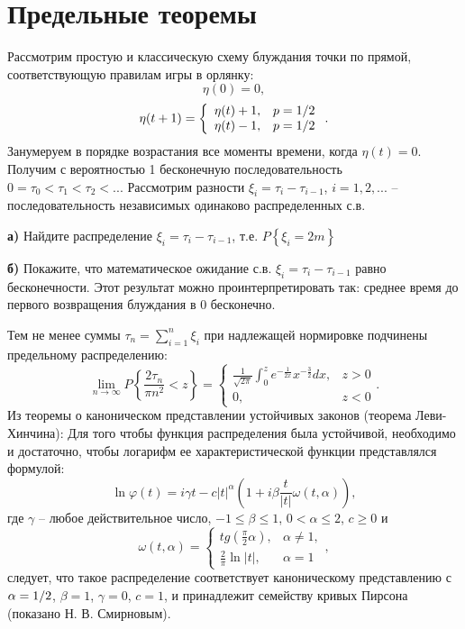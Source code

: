 \section{Предельные теоремы}

\begin{problem}

Рассмотрим простую и классическую схему блуждания точки по прямой, соответствующую правилам игры в орлянку:
\[\eta (0)=0,\] 
\[\eta (t+1)=\left\{\begin{array}{cc} {\eta (t)+1,} & {p={1\mathord{\left/ {\vphantom {1 2}} \right. \kern-\nulldelimiterspace} 2} } \\ {\eta (t)-1,} & {p={1\mathord{\left/ {\vphantom {1 2}} \right. \kern-\nulldelimiterspace} 2} } \end{array}\right. .\] 
Занумеруем в порядке возрастания все моменты времени, когда $\eta (t)=0$. Получим с вероятностью 1 бесконечную последовательность $0=\tau _{0} <\tau _{1} <\tau _{2} <...$ Рассмотрим разности $\xi _{i} =\tau _{i} -\tau _{i-1} $, $i=1,2,...$ -- последовательность независимых одинаково распределенных с.в.

\textbf{а)} Найдите распределение $\xi _{i} =\tau _{i} -\tau _{i-1} $, т.е. $P\left\{\xi _{i} =2m\right\}$

\textbf{б)} Покажите, что математическое ожидание с.в. $\xi _{i} =\tau _{i} -\tau _{i-1} $ равно бесконечности. Этот результат можно проинтерпретировать так: среднее время до первого возвращения блуждания в 0 бесконечно.

Тем не менее суммы $\tau _{n} =\sum _{i=1}^{n}\xi _{i}  $ при надлежащей нормировке подчинены предельному распределению: 
\[\mathop{\lim }\limits_{n\to \infty } P\left\{\frac{2\tau _{n} }{\pi n^{2} } <z\right\}=\left\{\begin{array}{cc} {\frac{1}{\sqrt{2\pi } } \int _{0}^{z}e^{-\frac{1}{2x} } x^{-\frac{3}{2} }  dx,} & {z>0} \\ {0,} & {z<0} \end{array}\right. .\] 
Из теоремы о каноническом представлении устойчивых законов (теорема Леви-Хинчина): Для того чтобы функция распределения была устойчивой, необходимо и достаточно, чтобы логарифм ее характеристической функции представлялся формулой:
\[\ln \varphi (t)=i\gamma t-c|t|^{\alpha } \left(1+i\beta \frac{t}{|t|} \omega (t,\alpha )\right),\] 
где $\gamma $ -- любое действительное число, $-1\le \beta \le 1$, $0<\alpha \le 2$, $c\ge 0$ и
\[\omega (t,\alpha )=\left\{\begin{array}{cc} {tg\left(\frac{\pi }{2} \alpha \right),} & {\alpha \ne 1,} \\ {\frac{2}{\pi } \ln |t|,} & {\alpha =1} \end{array}\right. ,\] 
следует, что такое распределение соответствует каноническому представлению с $\alpha ={1\mathord{\left/ {\vphantom {1 2}} \right. \kern-\nulldelimiterspace} 2} $, $\beta =1$, $\gamma =0$, $c=1$, и принадлежит семейству кривых Пирсона (показано Н. В. Смирновым).

\end{problem}

